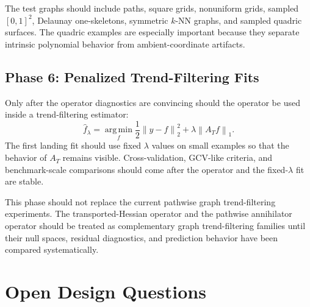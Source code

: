 \documentclass[11pt]{article}
\newcommand{\norm}[1]{\left\lVert #1 \right\rVert}
\newcommand{\argmin}{\operatorname*{arg\,min}}
\begin{document}
The test graphs should include paths, square grids, nonuniform grids, sampled
\([0,1]^2\), Delaunay one-skeletons, symmetric \(k\)-NN graphs, and sampled
quadric surfaces.  The quadric examples are especially important because they
separate intrinsic polynomial behavior from ambient-coordinate artifacts.

\subsection{Phase 6: Penalized Trend-Filtering Fits}

Only after the operator diagnostics are convincing should the operator be used
inside a trend-filtering estimator:
\[
  \hat f_\lambda
  =
  \argmin_f
  \frac12\norm{y-f}_2^2
  +
  \lambda\norm{A_Tf}_1.
\]
The first landing fit should use fixed \(\lambda\) values on small examples so
that the behavior of \(A_T\) remains visible.  Cross-validation, GCV-like
criteria, and benchmark-scale comparisons should come after the operator and
the fixed-\(\lambda\) fit are stable.

This phase should not replace the current pathwise graph trend-filtering
experiments.  The transported-Hessian operator and the pathwise annihilator
operator should be treated as complementary graph trend-filtering families
until their null spaces, residual diagnostics, and prediction behavior have
been compared systematically.

\section{Open Design Questions}
\end{document}
